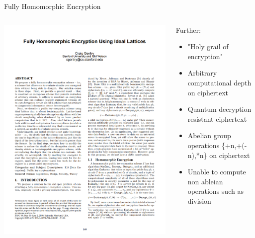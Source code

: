 \documentclass[aspectratio=169]{beamer}
\begin{document}
    \begin{frame}{Fully Homomorphic Encryption}
      \begin{columns}
        \begin{column}{0.5\textwidth}
          \includegraphics[width=0.8\linewidth]{gentry.png}
        \end{column}
        \begin{column}{0.5\textwidth}
          Further:\\[.2cm]
          \begin{itemize}
            \item "Holy grail of encryption"
            \item Arbitrary computational depth on ciphertext
            \item Quantum decryption resistant ciphertext
            \item Abelian group operations \{+n,+(-n),*n\} on ciphertext
            \item Unable to compute non ableian operations such as division
          \end{itemize}
        \end{column}
      \end{columns}
    \end{frame}
\end{document}
